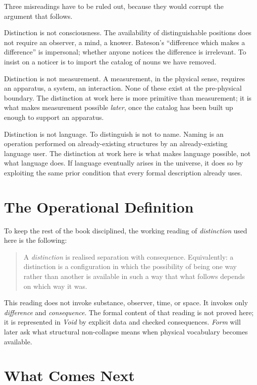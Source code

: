 \documentclass[11pt,a4paper]{book}
\begin{document}
Three misreadings have to be ruled out, because they would corrupt the argument that follows.

Distinction is not consciousness. The availability of distinguishable positions does not require an observer, a mind, a knower. Bateson's ``difference which makes a difference'' is impersonal; whether anyone notices the difference is irrelevant. To insist on a noticer is to import the catalog of nouns we have removed.

Distinction is not measurement. A measurement, in the physical sense, requires an apparatus, a system, an interaction. None of these exist at the pre-physical boundary. The distinction at work here is more primitive than measurement; it is what makes measurement possible \emph{later}, once the catalog has been built up enough to support an apparatus.

Distinction is not language. To distinguish is not to name. Naming is an operation performed on already-existing structures by an already-existing language user. The distinction at work here is what makes language possible, not what language does. If language eventually arises in the universe, it does so by exploiting the same prior condition that every formal description already uses.

\section*{The Operational Definition}

To keep the rest of the book disciplined, the working reading of \emph{distinction} used here is the following:

\begin{quote}
A \emph{distinction} is realised separation with consequence. Equivalently: a distinction is a configuration in which the possibility of being one way rather than another is available in such a way that what follows depends on which way it was.
\end{quote}

This reading does not invoke substance, observer, time, or space. It invokes only \emph{difference} and \emph{consequence}. The formal content of that reading is not proved here; it is represented in \textit{Void} by explicit data and checked consequences. \textit{Form} will later ask what structural non-collapse means when physical vocabulary becomes available.

\section*{What Comes Next}
\end{document}
